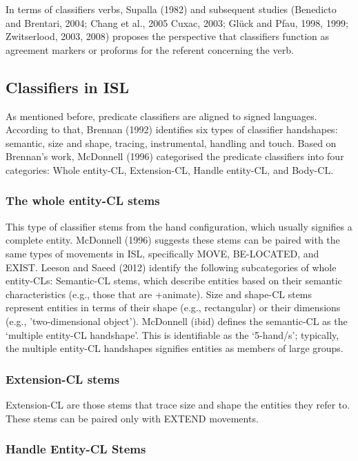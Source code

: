 In terms of classifiers verbs, Supalla (1982) and subsequent studies (Benedicto and 
Brentari, 2004; Chang et al., 2005 Cuxac, 2003; Glück and Pfau, 1998, 1999; 
Zwitserlood, 2003, 2008) proposes the perspective that classifiers function as 
agreement markers or proforms for the referent concerning the verb.

\subsection{Classifiers in ISL}

As mentioned before, predicate classifiers are aligned to signed languages. According 
to that, Brennan (1992) identifies six types of classifier handshapes: semantic, size 
and shape, tracing, instrumental, handling and touch. Based on Brennan's work, 
McDonnell (1996) categorised the predicate classifiers into four categories: Whole 
entity-CL, Extension-CL, Handle entity-CL, and Body-CL. 

\subsubsection{The whole entity-CL stems}

This type of classifier stems from the hand configuration, which usually signifies a 
complete entity. McDonnell (1996) suggests these stems can be paired with the same 
types of movements in ISL, specifically MOVE, BE-LOCATED, and EXIST. Leeson and Saeed 
(2012) identify the following subcategories of whole entity-CLs: Semantic-CL stems, 
which describe entities based on their semantic characteristics (e.g., those that are 
+animate). Size and shape-CL stems represent entities in terms of their shape (e.g., 
rectangular) or their dimensions (e.g., 'two-dimensional object').
McDonnell (ibid) defines the semantic-CL as the ‘multiple entity-CL handshape’. This 
is identifiable as the ‘5-hand/s’; typically, the multiple entity-CL handshapes 
signifies entities as members of large groups.

\subsubsection{Extension-CL stems}

Extension-CL are those stems that trace size and shape the entities they refer to. 
These stems can be paired only with EXTEND movements. 

\subsubsection{Handle Entity-CL Stems}

